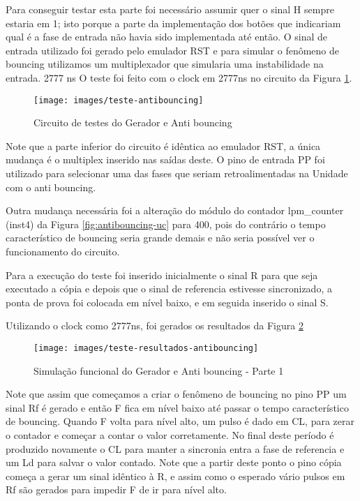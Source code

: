 \documentclass[12pt,a4paper,openany]{abntex2}
\begin{document}
Para conseguir testar esta parte foi necessário assumir quer o sinal H sempre estaria em 1; isto porque a parte da implementação dos botões que indicariam qual é a fase de entrada não havia sido implementada até então. O sinal de entrada utilizado foi gerado pelo emulador RST e para simular o fenômeno de bouncing utilizamos um multiplexador que simularia uma instabilidade na entrada.
2777 ns
O teste foi feito com o clock em 2777ns no circuito da Figura \ref{fig:teste-antibouncing}.

\begin{figure}[!htp]
	\centering
	\caption{Circuito de testes do Gerador e Anti bouncing}
	\texttt{[image: images/teste-antibouncing]}	\label{fig:teste-antibouncing}
\end{figure}

Note que a parte inferior do circuito é idêntica ao emulador RST, a única mudança é o multiplex inserido nas saídas deste. O pino de entrada PP foi utilizado para selecionar uma das fases que seriam retroalimentadas na Unidade com o anti bouncing.

Outra mudança necessária foi a alteração do módulo do contador lpm\_counter (inst4) da Figura \ref{fig:antibouncing-uc} para 400, pois do contrário o tempo característico de bouncing seria grande demais e não seria possível ver o funcionamento do circuito.

Para a execução do teste foi inserido inicialmente o sinal R para que seja executado a cópia e depois que o sinal de referencia estivesse sincronizado, a ponta de prova foi colocada em nível baixo, e em seguida inserido o sinal S.

Utilizando o clock como 2777ns, foi gerados os resultados da Figura \ref{fig:teste-resultados-antibouncing}

\begin{figure}[!htp]
	\centering
	\caption{Simulação funcional do Gerador e Anti bouncing - Parte 1}
	\texttt{[image: images/teste-resultados-antibouncing]}	\label{fig:teste-resultados-antibouncing}
\end{figure}

Note que assim que começamos a criar o fenômeno de bouncing no pino PP um sinal Rf é gerado e então F fica em nível baixo até passar o tempo característico de bouncing. Quando F volta para nível alto, um pulso é dado em CL, para zerar o contador e começar a contar o valor corretamente. No final deste período é produzido novamente o CL para manter a sincronia entra a fase de referencia e um Ld para salvar o valor contado. Note que a partir deste ponto o pino cópia começa a gerar um sinal idêntico à R, e assim como o esperado vário pulsos em Rf são gerados para impedir F de ir para nível alto.
\end{document}

